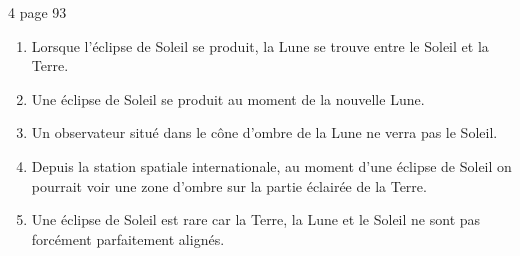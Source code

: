 \begin{myact}{4 page 93}
	\begin{enumerate}
		\item Lorsque l'éclipse de Soleil se produit, la Lune se trouve entre le Soleil et la Terre.\pause
		\item Une éclipse de Soleil se produit au moment de la nouvelle Lune.\pause
		\item Un observateur situé dans le cône d'ombre de la Lune ne verra pas le Soleil.\pause
		\item Depuis la station spatiale internationale, au moment d'une éclipse de Soleil on pourrait voir une zone d'ombre sur la partie éclairée de la Terre.\pause
		\item Une éclipse de Soleil est rare car la Terre, la Lune et le Soleil ne sont pas forcément parfaitement alignés.
	\end{enumerate}
\end{myact}